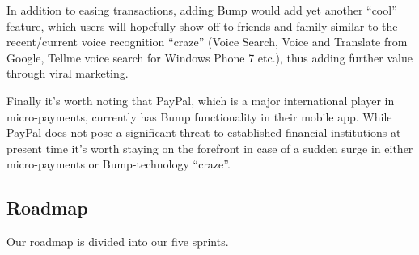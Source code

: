 \documentclass[a4paper,11pt]{article}
\begin{document}
In addition to easing transactions, adding Bump would add yet another ``cool'' feature, which users will hopefully show off to friends and family similar to the recent/current voice recognition ``craze'' (Voice Search, Voice and Translate from Google, Tellme voice search for Windows Phone 7 etc.), thus adding further value through viral marketing.

Finally it's worth noting that PayPal, which is a major international player in micro-payments, currently has Bump functionality in their mobile app. While PayPal does not pose a significant threat to established financial institutions at present time it's worth staying on the forefront in case of a sudden surge in either micro-payments or Bump-technology ``craze''.


\subsection{Roadmap} %
\label{subsec:roadmap}
Our roadmap is divided into our five sprints.
\end{document}

